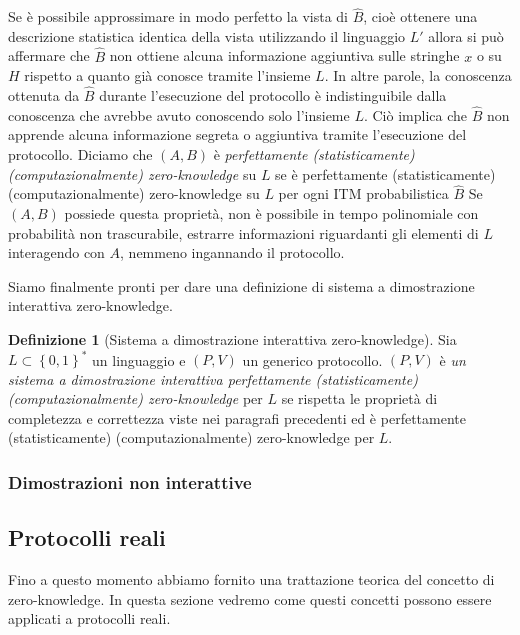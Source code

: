 \documentclass{article}
\theoremstyle{definition}
\newtheorem{definizione}{Definizione}
\begin{document}
Se è possibile approssimare in modo perfetto la vista di $\hat{B}$, cioè ottenere una descrizione statistica identica della vista utilizzando il linguaggio $L'$ allora si può affermare che $\hat{B}$ non ottiene alcuna informazione aggiuntiva sulle stringhe $x$ o su $H$ rispetto a quanto già conosce tramite l'insieme $L$. In altre parole, la conoscenza ottenuta da $\hat{B}$ durante l'esecuzione del protocollo è indistinguibile dalla conoscenza che avrebbe avuto conoscendo solo l'insieme $L$. Ciò implica che $\hat{B}$ non apprende alcuna informazione segreta o aggiuntiva tramite l'esecuzione del protocollo.
Diciamo che $(A,B)$ è \emph{perfettamente (statisticamente) (computazionalmente) zero-knowledge} su $L$ se è perfettamente (statisticamente) (computazionalmente) zero-knowledge su $L$ per ogni ITM probabilistica $\hat{B}$ 
Se $(A,B)$ possiede questa proprietà, non è possibile in tempo polinomiale con probabilità non trascurabile, estrarre informazioni riguardanti gli elementi di $L$ interagendo con $A$, nemmeno ingannando il protocollo.
 
Siamo finalmente pronti per dare una definizione di sistema a dimostrazione interattiva zero-knowledge.

\begin{definizione}[Sistema a dimostrazione interattiva zero-knowledge]
    Sia $L \subset \left\{ 0,1 \right\}^*$ un linguaggio e $(P, V)$ un generico protocollo. $(P, V)$ è \emph{un sistema a dimostrazione interattiva perfettamente (statisticamente) (computazionalmente) zero-knowledge} per $L$ se rispetta le proprietà di completezza e correttezza viste nei paragrafi precedenti ed è perfettamente (statisticamente) (computazionalmente) zero-knowledge per $L$.
\end{definizione}



\subsubsection{Dimostrazioni non interattive}

\subsection{Protocolli reali}
Fino a questo momento abbiamo fornito una trattazione teorica del concetto di zero-knowledge. In questa sezione vedremo come questi concetti possono essere applicati a protocolli reali.
\end{document}
